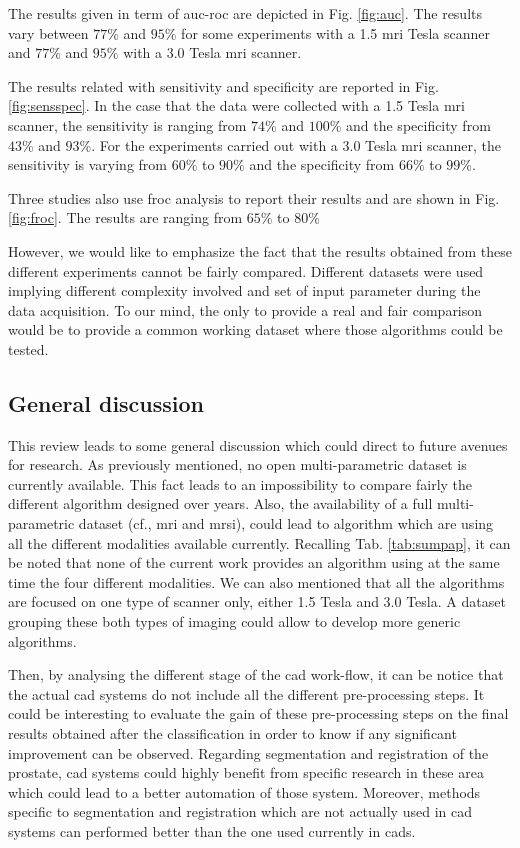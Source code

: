 The results given in term of \ac{auc}-\ac{roc} are depicted in Fig. \ref{fig:auc}. The results vary between $77\%$ and $95\%$ for some experiments with a 1.5 \ac{mri} Tesla scanner and $77\%$ and $95\%$ with a 3.0 Tesla \ac{mri} scanner. 

The results related with sensitivity and specificity are reported in Fig. \ref{fig:sensspec}. In the case that the data were collected with a 1.5 Tesla \ac{mri} scanner, the sensitivity is ranging from $74\%$ and $100\%$ and the specificity from $43\%$ and $93\%$. For the experiments carried out with a 3.0 Tesla \ac{mri} scanner, the sensitivity is varying from $60\%$ to $90\%$ and the specificity from $66\%$ to $99\%$.

Three studies also use \ac{froc} analysis to report their results and are shown in Fig. \ref{fig:froc}. The results are ranging from $65\%$ to $80\%$

However, we would like to emphasize the fact that the results obtained from these different experiments cannot be fairly compared. Different datasets were used implying different complexity involved and set of input parameter during the data acquisition. To our mind, the only to provide a real and fair comparison would be to provide a common working dataset where those algorithms could be tested.

\subsection{General discussion}

This review leads to some general discussion which could direct to future avenues for research. As previously mentioned, no open multi-parametric dataset is currently available. This fact leads to an impossibility to compare fairly the different algorithm designed over years. Also, the availability of a full multi-parametric dataset (cf., \ac{mri} and \ac{mrsi}), could lead to algorithm which are using all the different modalities available currently. Recalling Tab. \ref{tab:sumpap}, it can be noted that none of the current work provides an algorithm using at the same time the four different modalities. We can also mentioned that all the algorithms are focused on one type of scanner only, either 1.5 Tesla and 3.0 Tesla. A dataset grouping these both types of imaging could allow to develop more generic algorithms.

Then, by analysing the different stage of the \ac{cad} work-flow, it can be notice that the actual \ac{cad} systems do not include all the different pre-processing steps. It could be interesting to evaluate the gain of these pre-processing steps on the final results obtained after the classification in order to know if any significant improvement can be observed. Regarding segmentation and registration of the prostate, \ac{cad} systems could highly benefit from specific research in these area which could lead to a better automation of those system. Moreover, methods specific to segmentation and registration which are not actually used in \ac{cad} systems can performed better than the one used currently in \acp{cad}.

